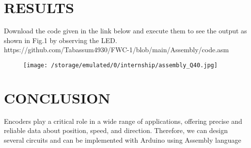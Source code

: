 \documentclass[conference]{IEEEtran}
\begin{document}
\section{RESULTS}
Download the code given in the link below and execute them to see the output as shown in Fig.1 by observing the LED. 
\\ https://github.com/Tabassum4930/FWC-1/blob/main/Assembly/code.asm
 \begin{figure}[h] 
	\centering 
	\texttt{[image: /storage/emulated/0/internship/assembly\_Q40.jpg]}
	\caption{\label{fig:Gates}}    
\end{figure}
\section{CONCLUSION}
Encoders play a critical role in a wide range of applications, offering precise and reliable data about position, speed, and direction. Therefore, we can design several circuits and can be implemented with Arduino using Assembly language
\end{document}

